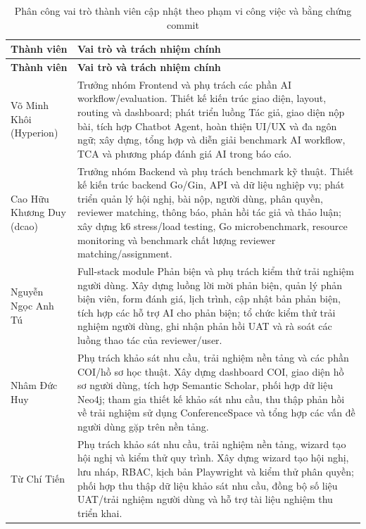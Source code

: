 \documentclass[12pt,a4paper]{article}
\begin{document}
\begin{longtable}{|>{\raggedright\arraybackslash}p{4cm}|>{\raggedright\arraybackslash}p{9.5cm}|}
\caption{Phân công vai trò thành viên cập nhật theo phạm vi công việc và bằng chứng commit} \\
\hline
\textbf{Thành viên} & \textbf{Vai trò và trách nhiệm chính} \\
\hline
\endfirsthead
\hline
\textbf{Thành viên} & \textbf{Vai trò và trách nhiệm chính} \\
\hline
\endhead
Võ Minh Khôi (Hyperion) & Trưởng nhóm Frontend và phụ trách các phần AI workflow/evaluation. Thiết kế kiến trúc giao diện, layout, routing và dashboard; phát triển luồng Tác giả, giao diện nộp bài, tích hợp Chatbot Agent, hoàn thiện UI/UX và đa ngôn ngữ; xây dựng, tổng hợp và diễn giải benchmark AI workflow, TCA và phương pháp đánh giá AI trong báo cáo. \\
\hline
Cao Hữu Khương Duy (dcao) & Trưởng nhóm Backend và phụ trách benchmark kỹ thuật. Thiết kế kiến trúc backend Go/Gin, API và dữ liệu nghiệp vụ; phát triển quản lý hội nghị, bài nộp, người dùng, phân quyền, reviewer matching, thông báo, phản hồi tác giả và thảo luận; xây dựng k6 stress/load testing, Go microbenchmark, resource monitoring và benchmark chất lượng reviewer matching/assignment. \\
\hline
Nguyễn Ngọc Anh Tú & Full-stack module Phản biện và phụ trách kiểm thử trải nghiệm người dùng. Xây dựng luồng lời mời phản biện, quản lý phản biện viên, form đánh giá, lịch trình, cập nhật bản phản biện, tích hợp các hỗ trợ AI cho phản biện; tổ chức kiểm thử trải nghiệm người dùng, ghi nhận phản hồi UAT và rà soát các luồng thao tác của reviewer/user. \\
\hline
Nhâm Đức Huy & Phụ trách khảo sát nhu cầu, trải nghiệm nền tảng và các phần COI/hồ sơ học thuật. Xây dựng dashboard COI, giao diện hồ sơ người dùng, tích hợp Semantic Scholar, phối hợp dữ liệu Neo4j; tham gia thiết kế khảo sát nhu cầu, thu thập phản hồi về trải nghiệm sử dụng ConferenceSpace và tổng hợp các vấn đề người dùng gặp trên nền tảng. \\
\hline
Từ Chí Tiến & Phụ trách khảo sát nhu cầu, trải nghiệm nền tảng, wizard tạo hội nghị và kiểm thử quy trình. Xây dựng wizard tạo hội nghị, lưu nháp, RBAC, kịch bản Playwright và kiểm thử phân quyền; phối hợp thu thập dữ liệu khảo sát nhu cầu, đồng bộ số liệu UAT/trải nghiệm người dùng và hỗ trợ tài liệu nghiệm thu triển khai. \\
\hline
\end{longtable}
\end{document}
